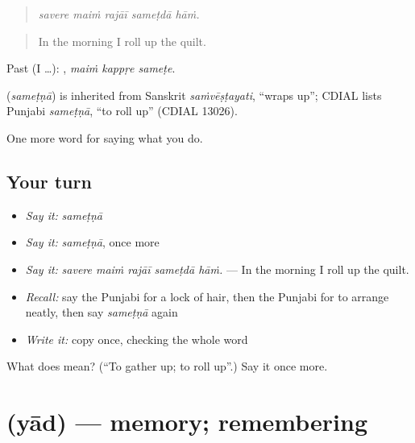 \begin{quote}
    
\end{quote}

\begin{quote}
\emph{savere maiṁ rajāī sameṭdā hāṁ.}
\end{quote}

\begin{quote}
In the morning I roll up the quilt.
\end{quote}

Past (I …):   , \emph{maiṁ kappṛe sameṭe}.

\begin{cousinweb}
\textbf{} (\emph{sameṭṇā}) is inherited from Sanskrit \emph{saṁvēṣṭayati}, \textquotedblleft{}wraps up\textquotedblright{}; CDIAL lists Punjabi \emph{sameṭṇā}, \textquotedblleft{}to roll up\textquotedblright{} (CDIAL 13026).
\end{cousinweb}

\begin{grammarlens}[title={What you've built}]
One more word for saying what you do.
\end{grammarlens}

\subsection*{Your turn}
\begin{itemize}
\raggedright
  \item \emph{Say it:} \emph{sameṭṇā}
  \item \emph{Say it:} \emph{sameṭṇā}, once more
  \item \emph{Say it:} \emph{savere maiṁ rajāī sameṭdā hāṁ.} — In the morning I roll up the quilt.
  \item \emph{Recall:} say the Punjabi for a lock of hair, then the Punjabi for to arrange neatly, then say \emph{sameṭṇā} again
  \item \emph{Write it:} copy \textbf{} once, checking the whole word
\end{itemize}

\begin{tcolorbox}[breakable,colback=teal!4,colframe=teal!35!black,title={Before you move on}]
What does  mean? (\textquotedblleft{}To gather up; to roll up\textquotedblright{}.) Say it once more.
\end{tcolorbox}
\section[\texorpdfstring{\pa{ਯਾਦ} (yād)}{ਯਾਦ (yād)}]{ (yād) — memory; remembering}

